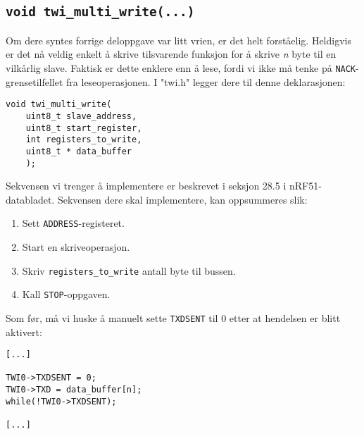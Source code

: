 \documentclass[11pt,a4paper]{article}
\begin{document}
\subsection{\texorpdfstring{\texttt{void twi_multi_write(...)}}{void twi\_multi\_write(...)}}
Om dere syntes forrige deloppgave var litt vrien, er det helt forståelig. Heldigvis er det nå veldig enkelt å skrive tilsvarende funksjon for å skrive \textit{n} byte til en vilkårlig slave. Faktisk er dette enklere enn å lese, fordi vi ikke må tenke på \texttt{NACK}-grensetilfellet fra leseoperasjonen. I "twi.h" legger dere til denne deklarasjonen:
\begin{verbatim}
void twi_multi_write(
	uint8_t slave_address,
	uint8_t start_register,
	int registers_to_write,
	uint8_t * data_buffer
	);
\end{verbatim}
Sekvensen vi trenger å implementere er beskrevet i seksjon 28.5 i nRF51-databladet. Sekvensen dere skal implementere, kan oppsummeres slik:
\begin{enumerate}
\item Sett \texttt{ADDRESS}-registeret.
\item Start en skriveoperasjon.
\item Skriv \texttt{registers_to_write} antall byte til bussen.
\item Kall \texttt{STOP}-oppgaven.
\end{enumerate}
Som før, må vi huske å manuelt sette \texttt{TXDSENT} til 0 etter at hendelsen er blitt aktivert:
\begin{verbatim}
[...]

TWI0->TXDSENT = 0;
TWI0->TXD = data_buffer[n];
while(!TWI0->TXDSENT);

[...]
\end{verbatim}
\end{document}
